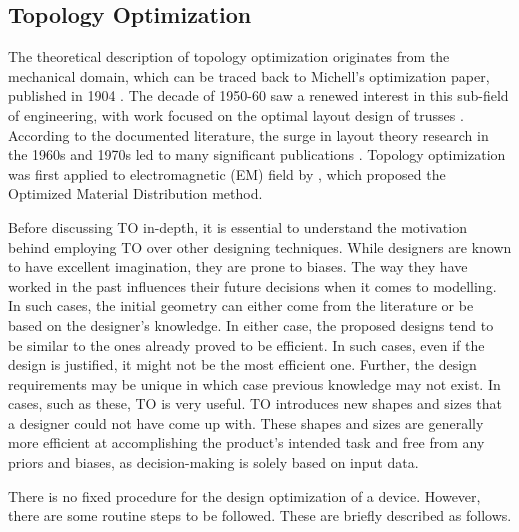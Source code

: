 \subsection{Topology Optimization}

The theoretical description  of topology  optimization  originates  from  the mechanical domain,  which  can  be  traced  back  to  Michell’s optimization paper, published in 1904 \parencite{lviiiagm1904limits}. The decade of 1950-60 saw a renewed interest in this sub-field of engineering, with work focused on the optimal layout design of trusses \parencite{cox1958structures, hemp1958theory}.
According to the documented literature, the surge in layout theory research in the 1960s and 1970s led to many significant publications \parencite{cox1958structures, prager1968problems, dobbs1969optimization}. Topology optimization was first applied to electromagnetic (EM) field by \parencite{dyck1996automated},  which  proposed  the Optimized  Material  Distribution method. 


Before discussing TO in-depth, it is essential to understand the motivation behind employing TO over other designing techniques. While designers are known to have excellent imagination, they are prone to biases. The way they have worked in the past influences their future decisions when it comes to modelling. In such cases, the initial geometry can either come from the literature or be based on the designer's knowledge. In either case, the proposed designs tend to be similar to the ones already proved to be efficient. In such cases, even if the design is justified, it might not be the most efficient one. Further, the design requirements may be unique in which case previous knowledge may not exist. In cases, such as these, TO is very useful. TO introduces new shapes and sizes that a designer could not have come up with. These shapes and sizes are generally more efficient at accomplishing the product’s intended task and free from any priors and biases, as decision-making is solely based on input data.

There is no fixed procedure for the design optimization of a device. However, there are some routine steps to be followed. These are briefly described as follows.

